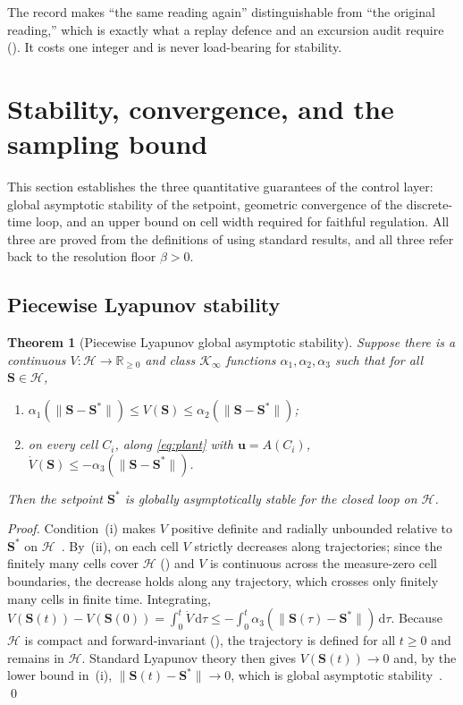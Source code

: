 \documentclass[11pt,a4paper,twocolumn]{article}
\theoremstyle{thmstyle}
\newtheorem{theorem}{Theorem}[section]
\theoremstyle{definition}
\theoremstyle{remark}
\newcommand{\R}{\mathbb{R}}
\newcommand{\Hs}{\mathcal{H}}
\newcommand{\Ss}{\mathbf{S}}
\newcommand{\Sstar}{\Ss^{\ast}}
\newcommand{\floor}{\beta}
\newcommand{\norm}[1]{\lVert#1\rVert}
\begin{document}
The record makes ``the same reading again'' distinguishable from ``the
original reading,'' which is exactly what a replay defence and an
excursion audit require (). It costs one integer and
is never load-bearing for stability.

\section{Stability, convergence, and the sampling bound}
\label{sec:stability}

This section establishes the three quantitative guarantees of the
control layer: global asymptotic stability of the setpoint, geometric
convergence of the discrete-time loop, and an upper bound on cell width
required for faithful regulation. All three are proved from the
definitions of  using standard
results, and all three refer back to the resolution floor $\floor>0$.

\subsection{Piecewise Lyapunov stability}

\begin{theorem}[Piecewise Lyapunov global asymptotic stability]
\label{thm:pwlyap}
Suppose there is a continuous $V\colon\Hs\to\R_{\ge0}$ and class
$\mathcal K_\infty$ functions $\alpha_1,\alpha_2,\alpha_3$ such that for
all $\Ss\in\Hs$,
\begin{enumerate}[label=\textup{(\roman*)},leftmargin=2.2em,itemsep=1pt]
\item $\alpha_1(\norm{\Ss-\Sstar})\le V(\Ss)\le\alpha_2(\norm{\Ss-\Sstar})$;
\item on every cell $C_i$, along \eqref{eq:plant} with
$\mathbf u=A(C_i)$,
$\dot V(\Ss)\le-\alpha_3(\norm{\Ss-\Sstar})$.
\end{enumerate}
Then the setpoint $\Sstar$ is globally asymptotically stable for the
closed loop on $\Hs$.
\end{theorem}

\begin{proof}
Condition~(i) makes $V$ positive definite and radially unbounded relative
to $\Sstar$ on $\Hs$~\citep{khalil2002nonlinear}. By~(ii), on each cell
$V$ strictly decreases along trajectories; since the finitely many cells
cover $\Hs$ () and $V$ is continuous across the
measure-zero cell boundaries, the decrease holds along any trajectory,
which crosses only finitely many cells in finite time. Integrating,
$V(\Ss(t))-V(\Ss(0))=\int_0^t\dot V\,\mathrm d\tau
\le-\int_0^t\alpha_3(\norm{\Ss(\tau)-\Sstar})\,\mathrm d\tau$. Because
$\Hs$ is compact and forward-invariant (), the
trajectory is defined for all $t\ge0$ and remains in $\Hs$. Standard
Lyapunov theory then gives $V(\Ss(t))\to0$ and, by the lower bound
in~(i), $\norm{\Ss(t)-\Sstar}\to0$, which is global asymptotic
stability~\citep{khalil2002nonlinear}. \qed
\end{proof}
\end{document}
